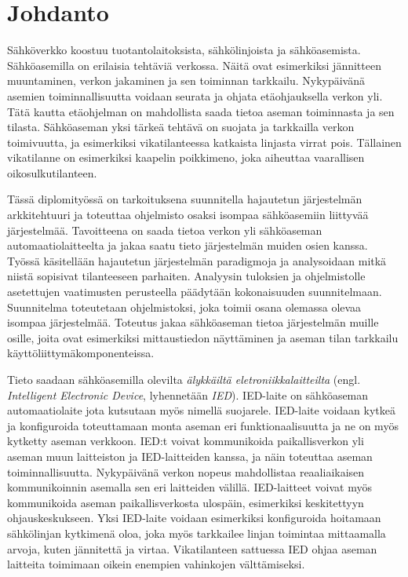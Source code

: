 \chapter{Johdanto}
\label{ch:johdanto}
Sähköverkko koostuu tuotantolaitoksista, sähkölinjoista ja sähköasemista. Sähköasemilla on erilaisia tehtäviä verkossa. Näitä ovat esimerkiksi jännitteen muuntaminen, verkon jakaminen ja sen toiminnan tarkkailu. Nykypäivänä asemien toiminnallisuutta voidaan seurata ja ohjata etäohjauksella verkon yli. Tätä kautta etäohjelman on mahdollista saada tietoa aseman toiminnasta ja sen tilasta. Sähköaseman yksi tärkeä tehtävä on suojata ja tarkkailla verkon toimivuutta, ja esimerkiksi vikatilanteessa katkaista linjasta virrat pois. Tällainen vikatilanne on esimerkiksi kaapelin poikkimeno, joka aiheuttaa vaarallisen oikosulkutilanteen.

Tässä diplomityössä on tarkoituksena suunnitella hajautetun järjestelmän arkkitehtuuri ja toteuttaa ohjelmisto osaksi isompaa sähköasemiin liittyvää järjestelmää. Tavoitteena on saada tietoa verkon yli sähköaseman automaatiolaitteelta ja jakaa saatu tieto järjestelmän muiden osien kanssa. Työssä käsitellään hajautetun järjestelmän paradigmoja ja analysoidaan mitkä niistä sopisivat tilanteeseen parhaiten. Analyysin tuloksien ja ohjelmistolle asetettujen vaatimusten perusteella päädytään kokonaisuuden suunnitelmaan. Suunnitelma toteutetaan ohjelmistoksi, joka toimii osana olemassa olevaa isompaa järjestelmää. Toteutus jakaa sähköaseman tietoa järjestelmän muille osille, joita ovat esimerkiksi mittaustiedon näyttäminen ja aseman tilan tarkkailu käyttöliittymäkomponenteissa.

Tieto saadaan sähköasemilla olevilta \emph{älykkäiltä eletroniikkalaitteilta} (engl. \emph{Intelligent Electronic Device}, lyhennetään \emph{IED}). IED-laite on sähköaseman automaatiolaite jota kutsutaan myös nimellä suojarele. IED-laite voidaan kytkeä ja konfiguroida toteuttamaan monta aseman eri funktionaalisuutta ja ne on myös kytketty aseman verkkoon. IED:t voivat kommunikoida paikallisverkon yli aseman muun laitteiston ja IED-laitteiden kanssa, ja näin toteuttaa aseman toiminnallisuutta. Nykypäivänä verkon nopeus mahdollistaa reaaliaikaisen kommunikoinnin asemalla sen eri laitteiden välillä. IED-laitteet voivat myös kommunikoida aseman paikallisverkosta ulospäin, esimerkiksi keskitettyyn ohjauskeskukseen. Yksi IED-laite voidaan esimerkiksi konfiguroida hoitamaan sähkölinjan kytkimenä oloa, joka myös tarkkailee linjan toimintaa mittaamalla arvoja, kuten jännitettä ja virtaa. Vikatilanteen sattuessa IED ohjaa aseman laitteita toimimaan oikein enempien vahinkojen välttämiseksi. \cite{Brunner2008}

